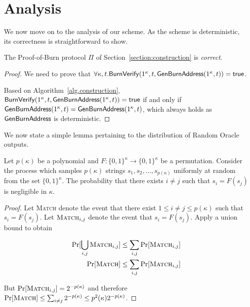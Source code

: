 \section{Analysis}

We now move on to the analysis of our scheme. As the scheme is deterministic,
its correctness is straightforward to show.

\begin{theorem}[Correctness]
  The Proof-of-Burn protocol $\Pi$ of Section~\ref{section:construction} is \emph{correct}.
\end{theorem}
\begin{proof}
  We need to prove that $\forall \kappa, t. \mathsf{BurnVerify}(1^\kappa, t, \mathsf{GenBurnAddress}(1^\kappa, t)) = \textsf{true}$.

  Based on Algorithm~\ref{alg.construction}, $\mathsf{BurnVerify}(1^\kappa, t, \mathsf{GenBurnAddress}(1^\kappa, t)) = \textsf{true}$ if and only if $\mathsf{GenBurnAddress}(1^\kappa, t) = \mathsf{GenBurnAddress}(1^\kappa, t)$, which always holds as $\mathsf{GenBurnAddress}$ is deterministic.
\end{proof}

We now state a simple lemma pertaining to the distribution of Random Oracle
outputs.

\begin{lemma}[Perturbation]
  \label{lem.perturbation}
  Let $p(\kappa)$ be a polynomial and
  $F: \{0,1\}^\kappa \longrightarrow \{0,1\}^\kappa$ be a permutation.
  Consider the process which samples $p(\kappa)$ strings $s_1, s_2, \dots, s_{p(\kappa)}$ uniformly at random from the set $\{0, 1\}^\kappa$. The probability that there exists $i \neq j$ such that $s_i = F(s_j)$ is negligible in $\kappa$.
\end{lemma}
\begin{proof}
  Let \textsc{Match} denote the event that there exist $1 \leq i \neq j \leq p(\kappa)$ such that $s_i = F(s_j)$.
  Let $\textsc{Match}_{i, j}$ denote the event that $s_i = F(s_j)$. Apply a union bound to obtain

  \begin{align*}
    \Pr[\bigcup_{i, j}\textsc{Match}_{i, j}] &\leq \sum_{i, j} \Pr[\textsc{Match}_{i, j}] \\
    \Pr[\textsc{Match}] &\leq \sum_{i, j} \Pr[\textsc{Match}_{i, j}]
  \end{align*}

  But $\Pr[\textsc{Match}_{i, j}] = 2^{-p(\kappa)}$ and therefore
  $\Pr[\textsc{Match}] \leq \sum_{i \neq j} 2^{-p(\kappa)} \leq p^2(\kappa) 2^{-p(\kappa)}$.
\end{proof}

